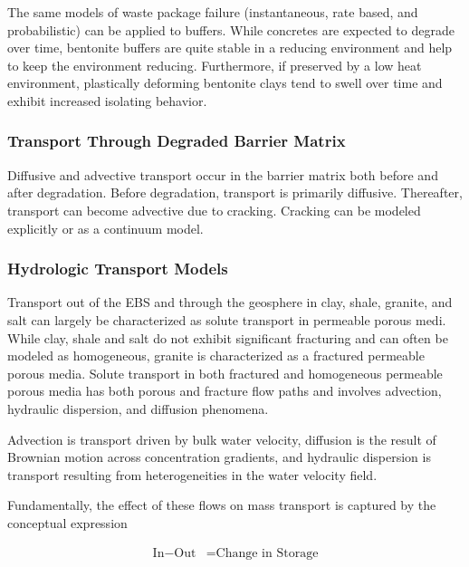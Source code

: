 The same models of waste package failure (instantaneous, rate based, and 
probabilistic) can be applied to buffers. While concretes are expected to 
degrade over time, bentonite buffers are quite stable in a reducing 
environment and help to keep the environment reducing. Furthermore, if 
preserved by a low heat environment, plastically deforming bentonite
clays tend to swell over time and exhibit increased isolating behavior.

\subsubsection{Transport Through Degraded Barrier Matrix}

Diffusive and advective transport occur in the barrier matrix both before and 
after degradation. Before degradation, transport is primarily diffusive. 
Thereafter, transport can become advective due to cracking. Cracking can be 
modeled explicitly or as a continuum model.  


\subsubsection{Hydrologic Transport Models}

Transport out of the \gls{EBS} and through the geosphere in clay, shale, granite,
and salt can largely be characterized as solute transport in permeable porous 
medi. While clay, shale and salt do not exhibit significant fracturing and can 
often be modeled as homogeneous, granite is  characterized as a fractured 
permeable porous media.  Solute transport in both fractured and homogeneous 
permeable porous media has both porous and fracture flow paths and involves
advection, hydraulic dispersion, and diffusion phenomena. 

Advection is transport driven by bulk water velocity, diffusion is the 
result of Brownian motion across concentration gradients, and hydraulic 
dispersion is transport resulting from heterogeneities in the water velocity field. 

Fundamentally, the effect of these flows on mass transport is captured by the 
conceptual expression 

\begin{align}
  \mbox{In} - \mbox{Out} &= \mbox{Change in Storage}
  \label{inout}
\end{align} 


